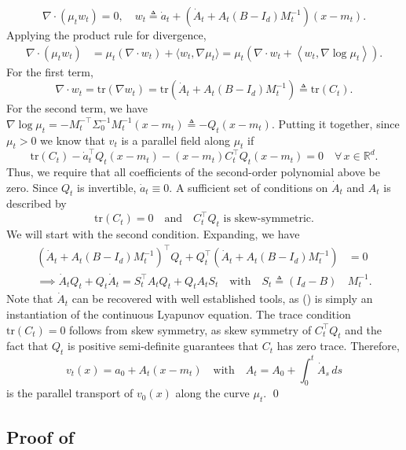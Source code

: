 \documentclass[11pt]{article}
\begin{document}
\[\nabla \cdot (\mu_tw_t) = 0, \quad w_t \triangleq \dot a_t + \left(\dot A_t + A_t(B-I_d)M_t^{-1}\right)(x-m_t).\]
Applying the product rule for divergence,
\begin{align*}
    \nabla\cdot (\mu_tw_t) &=  \mu_t (\nabla \cdot w_t) + \langle w_t, \nabla \mu_t\rangle = \mu_t\left(\nabla \cdot w_t + \left\langle w_t, \nabla \log \mu_t\right\rangle\right).
\end{align*}
For the first term, 
\[\nabla \cdot w_t = \text{tr}(\nabla w_t) = \text{tr}\left(\dot A_t + A_t(B - I_d)M_t^{-1}\right) \triangleq \text{tr}\left(C_t\right).\]
For the second term, we have $\nabla \log \mu_t = -M_t^{-\top}\Sigma^{-1}_0M_t^{-1}\left(x - m_t\right) \triangleq - Q_t(x-m_t).$ Putting it together, since $\mu_t > 0$ we know that $v_t$ is a parallel field along $\mu_t$ if  
\[\text{tr}(C_t) - \dot a_t^{\top}Q_t(x-m_t) - (x-m_t)C_t^{\top}Q_t(x-m_t) = 0 \quad \forall \, x \in \mathbb{R}^d.\]
Thus, we require that all coefficients of the second-order polynomial above be zero. Since $Q_t$ is invertible, $\dot a_t \equiv 0$. A sufficient set of conditions on $\dot A_t$ and $A_t$ is described by 
\[\text{tr}\left(C_t\right) = 0 \quad \text{and} \quad C_t^{\top}Q_t \text{ is skew-symmetric}.\]
We will start with the second condition. Expanding, we have
\begin{align*}
\left(\dot A_t + A_t(B - I_d)M_t^{-1}\right)^{\top}Q_t + Q_t^{\top}\left(\dot A_t + A_t(B - I_d)M_t^{-1}\right) &= 0 \\
\implies \dot A_tQ_t + Q_t\dot A_t = S_t^{\top}A_tQ_t + Q_tA_tS_t \quad \text{with} \quad S_t \triangleq (I_d - B)&M_t^{-1}. \tag{\textasteriskcentered}
\end{align*}
Note that $\dot A_t$ can be recovered with well established tools, as (\textasteriskcentered) is simply an instantiation of the continuous Lyapunov equation. The trace condition $\text{tr}(C_t) = 0$ follows from skew symmetry, as skew symmetry of $C_t^{\top} Q_t$ and the fact that $Q_t$ is positive semi-definite guarantees that $C_t$ has zero trace. Therefore, 
\[v_t(x) = a_0 + A_t(x - m_t) \quad \text{with} \quad A_t =  A_0 + \int_0^t\dot A_s \, ds\]
is the parallel transport of $v_0(x)$ along the curve $\mu_t$. \qed{}

\subsection{Proof of } \label{sec: proof of gradient representer thm}
\end{document}
